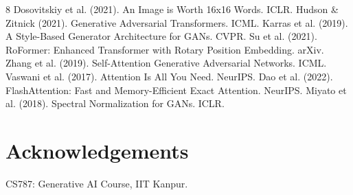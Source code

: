 \documentclass[12pt,a4paper]{article}
\begin{document}



\begin{thebibliography}{8}
 Dosovitskiy et al. (2021). An Image is Worth 16x16 Words. ICLR.
 Hudson \& Zitnick (2021). Generative Adversarial Transformers. ICML.
 Karras et al. (2019). A Style-Based Generator Architecture for GANs. CVPR.
 Su et al. (2021). RoFormer: Enhanced Transformer with Rotary Position Embedding. arXiv.
 Zhang et al. (2019). Self-Attention Generative Adversarial Networks. ICML.
 Vaswani et al. (2017). Attention Is All You Need. NeurIPS.
 Dao et al. (2022). FlashAttention: Fast and Memory-Efficient Exact Attention. NeurIPS.
 Miyato et al. (2018). Spectral Normalization for GANs. ICLR.
\end{thebibliography}

\section*{Acknowledgements}
CS787: Generative AI Course, IIT Kanpur.
\end{document}
